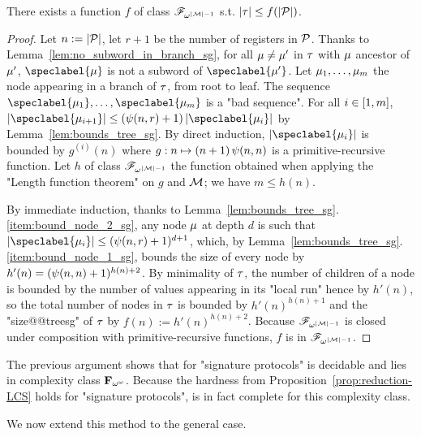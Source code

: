 \begin{proposition}
\label{prop:bounded_witness_sg}
There exists a function $f$ of class $\mathscr{F}_{\omega^{|\mathcal{M}|-1}}$ s.t. $|\tau| \leq f(|\mathcal{P}|)$. 
\end{proposition}
\begin{proof}
Let $n := |\mathcal{P}|$, let $r+1$ be the number of registers in $\mathcal{P}$. Thanks to Lemma~\ref{lem:no_subword_in_branch_sg}, for all $\mu \ne \mu'$ in 
$\tau$ with $\mu$ ancestor of $\mu'$, $\speclabel{\node}$ is not a subword of $\speclabel{\node'}$.  Let $\mu_1, \dots, \mu_m$ the node appearing in a branch of $\tau$, from root to leaf. The sequence $\speclabel{\node_1}, \dots, \speclabel{\node_m}$ is a "bad sequence".
For all $i \in [1,m]$, $\size{\speclabel{\node_{i+1}}}  \leq (\towerfun(n,r)+1) \, \size{\speclabel{\node_i}}$ by Lemma~\ref{lem:bounds_tree_sg}. By direct induction, $\size{\speclabel{\node_i}}$ is bounded by $g^{(i)}(n)$ where $g: n \mapsto (n+1)  \, \psi(n,n)$ is a primitive-recursive function. Let $h$ of class $\mathscr{F}_{\omega^{|\mathcal{M}|-1}}$ the function obtained when applying the "Length function theorem" on $g$ and $\mathcal{M}$; we have $m \leq h(n)$. 

By immediate induction, thanks to Lemma~\ref{lem:bounds_tree_sg}.\ref{item:bound_node_2_sg}, any node $\mu$ at depth $d$ is such that $\size{\speclabel{\node_i}} \leq (\towerfun(n,r)+1)^{d+1}$, which, by Lemma~\ref{lem:bounds_tree_sg}.\ref{item:bound_node_1_sg}, bounds the size of every node by $h'(n) = (\psi(n,n)+1)^{h(n) + 2}$. 
By minimality of $\tau$, the number of children of a node is bounded by the number of values appearing in its "local run" hence by $h'(n)$, so the total number of nodes in $\tau$ is bounded by $h'(n)^{h(n)+1}$ and the "size@@treesg" of $\tau$ by $f(n) := h'(n)^{h(n)+2}$. Because $\mathscr{F}_{\omega^{|\mathcal{M}|-1}}$ is closed under composition with primitive-recursive functions, $f$ is in $\mathscr{F}_{\omega^{|\mathcal{M}|-1}}$.
\end{proof}

The previous argument shows that \COVER for "signature protocols" is decidable and lies in complexity class $\mathbf{F}_{\omega^\omega}$. Because the hardness from Proposition~\ref{prop:reduction-LCS} holds for "signature protocols", \COVER is in fact complete for this complexity class.

We now extend this method to the general case. 

